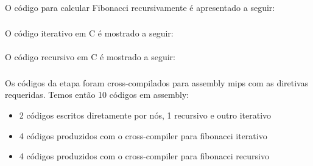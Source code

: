 \paragraph{}
O código para calcular Fibonacci recursivamente é apresentado a seguir:
\begin{tiny}
    
\end{tiny}   

\subsubsection{}
\paragraph{} O código iterativo em C é mostrado a seguir:
\begin{tiny}
    
\end{tiny}   

\paragraph{} O código recursivo em C é mostrado a seguir:
\begin{tiny}
    
\end{tiny}   


\subsubsection{}
\paragraph{}Os códigos da etapa foram cross-compilados para assembly mips com as diretivas requeridas.
Temos então 10 códigos em assembly:
\begin{itemize}
       \item 2 códigos escritos diretamente por nós, 1 recursivo e outro iterativo
       \item 4 códigos produzidos com o cross-compiler para fibonacci iterativo
       \item 4 códigos produzidos com o cross-compiler para fibonacci recursivo
\end{itemize}

